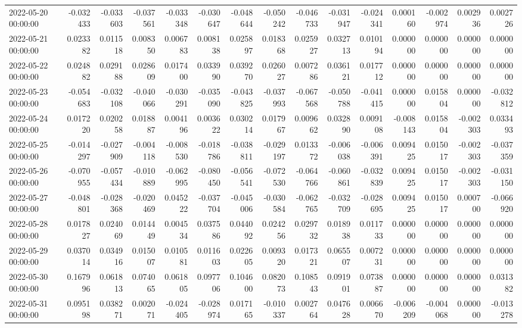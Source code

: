\begin{tabular}{lrrrrrrrrrrrrrr}
2022-05-20 00:00:00 & -0.032433 & -0.033603 & -0.037561 & -0.033348 & -0.030647 & -0.048644 & -0.050242 & -0.046733 & -0.031947 & -0.024341 & 0.000160 & -0.002974 & 0.002936 & 0.002726 \\
2022-05-21 00:00:00 & 0.023382 & 0.011518 & 0.008350 & 0.006783 & 0.008138 & 0.025897 & 0.018368 & 0.025927 & 0.032713 & 0.010194 & 0.000000 & 0.000000 & 0.000000 & 0.000000 \\
2022-05-22 00:00:00 & 0.024882 & 0.029188 & 0.028609 & 0.017400 & 0.033990 & 0.039270 & 0.026027 & 0.007286 & 0.036121 & 0.017712 & 0.000000 & 0.000000 & 0.000000 & 0.000000 \\
2022-05-23 00:00:00 & -0.054683 & -0.032108 & -0.040066 & -0.030291 & -0.035090 & -0.043825 & -0.037993 & -0.067568 & -0.050788 & -0.041415 & 0.000000 & 0.015804 & 0.000000 & -0.032812 \\
2022-05-24 00:00:00 & 0.017220 & 0.020258 & 0.018887 & 0.004196 & 0.003622 & 0.030214 & 0.017967 & 0.009662 & 0.032890 & 0.009108 & -0.008143 & 0.015804 & -0.002303 & 0.033493 \\
2022-05-25 00:00:00 & -0.014297 & -0.027909 & -0.004118 & -0.008530 & -0.018786 & -0.038811 & -0.029197 & 0.013372 & -0.006038 & -0.006391 & 0.009425 & 0.015017 & -0.002303 & -0.037359 \\
2022-05-26 00:00:00 & -0.070955 & -0.057434 & -0.010889 & -0.062995 & -0.080450 & -0.056541 & -0.072530 & -0.064766 & -0.060861 & -0.032839 & 0.009425 & 0.015017 & -0.002303 & -0.031150 \\
2022-05-27 00:00:00 & -0.048801 & -0.028368 & -0.020469 & 0.045222 & -0.037704 & -0.045006 & -0.030584 & -0.062765 & -0.032709 & -0.028695 & 0.009425 & 0.015017 & 0.000700 & -0.066920 \\
2022-05-28 00:00:00 & 0.017827 & 0.024069 & 0.014449 & 0.004534 & 0.037586 & 0.044092 & 0.024256 & 0.029732 & 0.018938 & 0.011733 & 0.000000 & 0.000000 & 0.000000 & 0.000000 \\
2022-05-29 00:00:00 & 0.037014 & 0.034916 & 0.015007 & 0.010581 & 0.011603 & 0.022605 & 0.009320 & 0.017321 & 0.065507 & 0.007231 & 0.000000 & 0.000000 & 0.000000 & 0.000000 \\
2022-05-30 00:00:00 & 0.167996 & 0.061813 & 0.074065 & 0.061805 & 0.097706 & 0.104600 & 0.082073 & 0.108543 & 0.091901 & 0.073887 & 0.000000 & 0.000000 & 0.000000 & 0.031382 \\
2022-05-31 00:00:00 & 0.095198 & 0.038271 & 0.002071 & -0.024405 & -0.028974 & 0.017165 & -0.010337 & 0.002764 & 0.047628 & 0.006670 & -0.006209 & -0.004068 & 0.000000 & -0.013278 \\

\end{tabular}
